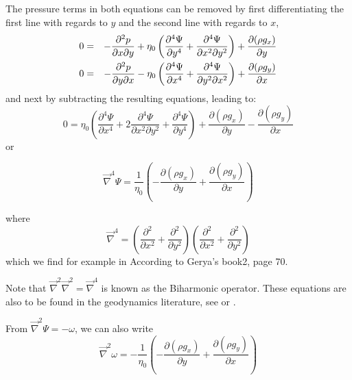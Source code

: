 The pressure terms in both equations can be removed by first differentiating
the first line with regards to $y$ and the second line with regards to $x$, 
\begin{eqnarray}
0 &=& -\frac{\partial^2 p}{\partial x\partial y} + \eta_0 \left(
\frac{\partial^4 \Psi}{\partial y^4}  + \frac{\partial^4 \Psi}{\partial x^2 \partial y^2} 
\right) + \frac{\partial (\rho g_x)}{\partial y} \nonumber\\
0 &=& -\frac{\partial^2 p}{\partial y \partial x} - \eta_0 \left(
\frac{\partial^4 \Psi}{\partial x^4}  + \frac{\partial^4 \Psi}{\partial y^2 \partial x^2} 
\right) + \frac{\partial (\rho g_y)}{\partial x}
\end{eqnarray}
and next by subtracting the resulting equations, leading to:
\begin{equation}
0 = \eta_0
\left(
\frac{\partial^4 \Psi}{\partial x^4} 
+
2\frac{\partial^4 \Psi}{\partial x^2\partial y^2} 
+
\frac{\partial^4 \Psi}{\partial y^4}
\right)
+\frac{\partial (\rho g_x)}{\partial y}
-\frac{\partial (\rho g_y)}{\partial x}
\end{equation}
or
\begin{mdframed}[backgroundcolor=blue!5]
\begin{equation}
\vec\nabla^4 \Psi = \frac{1}{\eta_0} \left( -\frac{\partial (\rho g_x)}{\partial y}
+\frac{\partial (\rho g_y)}{\partial x} \right)
\end{equation}
\end{mdframed}
where
\[
\vec\nabla^4 =
\left(
\frac{\partial^2 }{\partial x^2} + \frac{\partial^2 }{\partial y^2}
\right)
\left(
\frac{\partial^2 }{\partial x^2} + \frac{\partial^2 }{\partial y^2}
\right)
\]
which we find for example in 
According to Gerya's book2, page 70.

Note that $\vec\nabla^2 \vec\nabla^2 = \vec\nabla^4 $ is known as the {\color{olive}Biharmonic operator}.
These equations are also to be found in the geodynamics literature, 
see \textcite[eq. 1.43]{tack10} or \textcite[p 70-71]{gery10}.

From $\vec\nabla^2 \Psi = -\omega $, we can also write
\begin{equation}
\vec\nabla^2 \omega = -\frac{1}{\eta_0} \left( -\frac{\partial (\rho g_x)}{\partial y}
+\frac{\partial (\rho g_y)}{\partial x} \right)
\end{equation}



